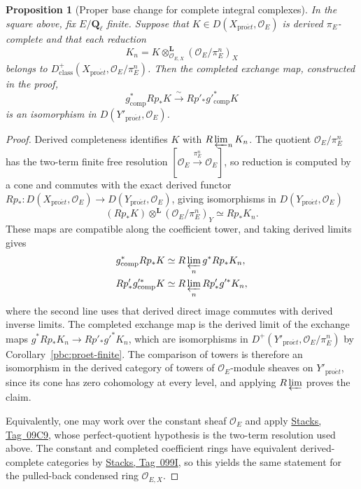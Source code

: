 \documentclass[11pt,a4paper]{article}
\numberwithin{equation}{section}
\newtheorem{proposition}[theorem]{Proposition}
\theoremstyle{definition}
\theoremstyle{remark}
\newcommand{\Ql}{\mathbf Q_\ell}
\newcommand{\proet}{\mathrm{pro}\acute{e}t}
\newcommand{\stacks}[1]{\href{https://stacks.math.columbia.edu/tag/#1}{\textnormal{Stacks, Tag~#1}}}
\begin{document}
\begin{proposition}[Proper base change for complete integral complexes]
\label{pbc:complete}
In the square above, fix $E/\Ql$ finite. Suppose that
$K\in D(X_{\proet},\mathcal O_E)$ is derived $\pi_E$-complete and that
each reduction
\[
 K_n=K\otimes^{\mathbf L}_{\mathcal O_{E,X}}
                           (\mathcal O_E/\pi_E^n)_X
\]
belongs to $D^+_{\mathrm{class}}(X_{\proet},\mathcal O_E/\pi_E^n)$.
Then the
completed exchange map, constructed in the proof,
\[
 g^*_{\mathrm{comp}}Rp_*K
       \xrightarrow{\ \sim\ }Rp'_*g'^*_{\mathrm{comp}}K
\]
is an isomorphism in $D(Y'_{\proet},\mathcal O_E)$.
\end{proposition}
\begin{proof}
Derived completeness identifies $K$ with $R\varprojlim_nK_n$.
The quotient $\mathcal O_E/\pi_E^n$ has the two-term finite free
resolution $[\mathcal O_E\xrightarrow{\pi_E^n}\mathcal O_E]$, so
reduction is computed by a cone and commutes with the exact derived
functor $Rp_*\colon D(X_{\proet},\mathcal O_E)\to
D(Y_{\proet},\mathcal O_E)$, giving isomorphisms in
$D(Y_{\proet},\mathcal O_E)$
\[
 (Rp_*K)\otimes^{\mathbf L}(\mathcal O_E/\pi_E^n)_Y
                         \simeq Rp_*K_n.
\]
These maps are compatible along the coefficient tower, and taking
derived limits gives
\[
 \begin{aligned}
 g^*_{\mathrm{comp}}Rp_*K
    &\simeq R\varprojlim_n g^*Rp_*K_n,\\
 Rp'_*g'^*_{\mathrm{comp}}K
    &\simeq R\varprojlim_n Rp'_*g'^*K_n,
 \end{aligned}
\]
where the second line uses that derived direct image commutes with
derived inverse limits. The completed exchange map is the derived
limit of the exchange maps $g^*Rp_*K_n\to Rp'_*g'^*K_n$, which are
isomorphisms in $D^+(Y'_{\proet},\mathcal O_E/\pi_E^n)$ by
Corollary~\ref{pbc:proet-finite}. The comparison of towers is
therefore an isomorphism in the derived category of towers of
$\mathcal O_E$-module sheaves on $Y'_{\proet}$,
since its cone has zero cohomology at every level, and applying
$R\varprojlim$ proves the claim.

Equivalently, one may work over the constant sheaf $\mathcal O_E$ and
apply \stacks{09C9}, whose perfect-quotient hypothesis is the two-term
resolution used above. The constant and completed coefficient rings
have equivalent derived-complete categories by \stacks{099I}, so this
yields the same statement for the pulled-back condensed ring
$\mathcal O_{E,X}$.
\end{proof}
\end{document}
